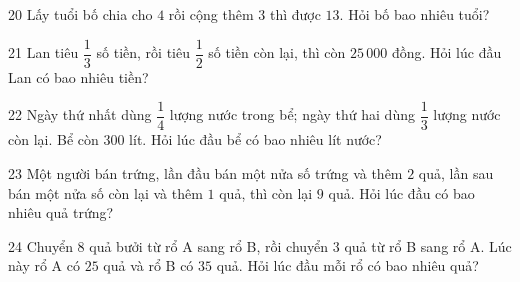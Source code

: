 \gap
\begin{probbox}{20}{\relax}
Lấy tuổi bố chia cho $4$ rồi cộng thêm $3$ thì được $13$. Hỏi bố bao nhiêu tuổi?
\end{probbox}
\gap
\begin{probbox}{21}{\relax}
Lan tiêu $\dfrac13$ số tiền, rồi tiêu $\dfrac12$ số tiền còn lại, thì còn $25\,000$ đồng. Hỏi lúc đầu Lan có bao nhiêu tiền?
\end{probbox}
\gap
\begin{probbox}{22}{\relax}
Ngày thứ nhất dùng $\dfrac14$ lượng nước trong bể; ngày thứ hai dùng $\dfrac13$ lượng nước còn lại. Bể còn $300$ lít. Hỏi lúc đầu bể có bao nhiêu lít nước?
\end{probbox}
\gap
\begin{probbox}{23}{\relax}
Một người bán trứng, lần đầu bán một nửa số trứng và thêm $2$ quả, lần sau bán một nửa số còn lại và thêm $1$ quả, thì còn lại $9$ quả. Hỏi lúc đầu có bao nhiêu quả trứng?
\end{probbox}
\gap
\begin{probbox}{24}{\relax}
Chuyển $8$ quả bưởi từ rổ A sang rổ B, rồi chuyển $3$ quả từ rổ B sang rổ A. Lúc này rổ A có $25$ quả và rổ B có $35$ quả. Hỏi lúc đầu mỗi rổ có bao nhiêu quả?
\end{probbox}
